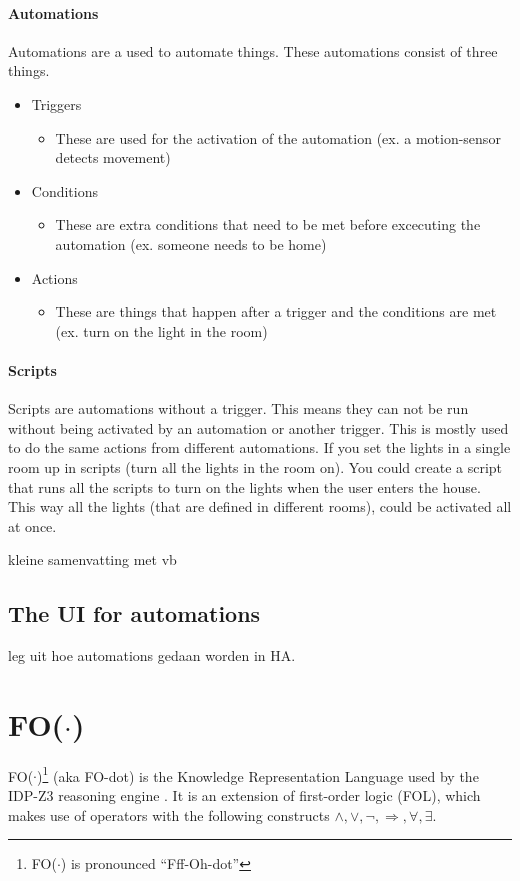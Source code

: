 \documentclass[11pt,a4paper]{report}
\newcommand{\fodot}{FO($\cdot$)\xspace}
\begin{document}
\paragraph{Automations}
Automations are a used to automate things. These automations consist of three things.
	\begin{itemize}
	    \item Triggers
        \begin{itemize}
            \item[] These are used for the activation of the automation (ex. a motion-sensor detects movement)
        \end{itemize}
        \item Conditions
        \begin{itemize}
            \item[] These are extra conditions that need to be met before excecuting the automation (ex. someone needs to be home)
        \end{itemize}
        \item Actions
        \begin{itemize}
            \item[] These are things that happen after a trigger and the conditions are met (ex. turn on the light in the room)
        \end{itemize}
	\end{itemize}
\paragraph{Scripts}
Scripts are automations without a trigger. This means they can not be run without being activated by an automation or another trigger. This is mostly used to do the same actions from different automations. If you set the lights in a single room up in scripts (turn all the lights in the room on). You could create a script that runs all the scripts to turn on the lights when the user enters the house. This way all the lights (that are defined in different rooms), could be activated all at once.

kleine samenvatting met vb

\subsection{The UI for automations}
leg uit hoe automations gedaan worden in HA.


\section{\fodot}
\fodot \footnote{\fodot is pronounced ``Fff-Oh-dot''} (aka FO-dot) is the Knowledge Representation Language used by the IDP-Z3 reasoning engine \cite{IDPZ3ReasoningEngine}. It is an extension of first-order logic (FOL), which makes use of operators with the following constructs $\land, \lor, \neg, \Rightarrow, \forall, \exists$.
\end{document}
